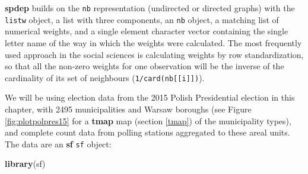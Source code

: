 \documentclass[]{book}
\newenvironment{Shaded}{\begin{snugshade}}{\end{snugshade}}
\newcommand{\CommentTok}[1]{\textcolor[rgb]{0.56,0.35,0.01}{\textit{#1}}}
\newcommand{\DataTypeTok}[1]{\textcolor[rgb]{0.13,0.29,0.53}{#1}}
\newcommand{\KeywordTok}[1]{\textcolor[rgb]{0.13,0.29,0.53}{\textbf{#1}}}
\newcommand{\NormalTok}[1]{#1}
\newcommand{\OperatorTok}[1]{\textcolor[rgb]{0.81,0.36,0.00}{\textbf{#1}}}
\newcommand{\StringTok}[1]{\textcolor[rgb]{0.31,0.60,0.02}{#1}}
\begin{document}
\textbf{spdep} builds on the \texttt{nb} representation (undirected or directed graphs) with the \texttt{listw} object, a list with three components, an \texttt{nb} object, a matching list of numerical weights, and a single element character vector containing the single letter name of the way in which the weights were calculated. The most frequently used approach in the social sciences is calculating weights by row standardization, so that all the non-zero weights for one observation will be the inverse of the cardinality of its set of neighbours (\texttt{1/card(nb{[}{[}i{]}{]})}).

We will be using election data from the 2015 Polish Presidential election in this chapter, with 2495 municipalities and Warsaw boroughs (see Figure \ref{fig:plotpolpres15} for a \textbf{tmap} map (section \ref{tmap}) of the municipality types), and complete count data from polling stations aggregated to these areal units. The data are an \textbf{sf} \texttt{sf} object:

\begin{Shaded}
\begin{Highlighting}[]
\KeywordTok{library}\NormalTok{(sf)}
\end{Highlighting}
\end{Shaded}

\begin{Shaded}
\end{Shaded}
\end{document}
